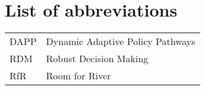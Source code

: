 \section*{List of abbreviations}
\label{s:gloss}
\begin{table}[h!]
\begin{tabular}{ll}
 DAPP& Dynamic Adaptive Policy Pathways \\
 RDM &  Robust Decision Making \\
 RfR &  Room for River\\
\end{tabular}
\end{table}